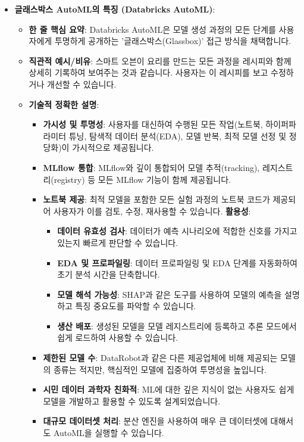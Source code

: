 \documentclass[11pt,a4paper]{article}
\theoremstyle{definition}
\begin{document}
\begin{itemize}
    \item \textbf{글래스박스 AutoML의 특징 (Databricks AutoML)}:
    \begin{itemize}
        \item \textbf{한 줄 핵심 요약}: Databricks AutoML은 모델 생성 과정의 모든 단계를 사용자에게 투명하게 공개하는 '글래스박스(Glassbox)' 접근 방식을 채택합니다.
        \item \textbf{직관적 예시/비유}: 스마트 오븐이 요리를 만드는 모든 과정을 레시피와 함께 상세히 기록하여 보여주는 것과 같습니다. 사용자는 이 레시피를 보고 수정하거나 개선할 수 있습니다.
        \item \textbf{기술적 정확한 설명}:
        \begin{itemize}
            \item \textbf{가시성 및 투명성}: 사용자를 대신하여 수행된 모든 작업(노트북, 하이퍼파라미터 튜닝, 탐색적 데이터 분석(EDA), 모델 반복, 최적 모델 선정 및 정당화)이 가시적으로 제공됩니다.
            \item \textbf{MLflow 통합}: MLflow와 깊이 통합되어 모델 추적(tracking), 레지스트리(registry) 등 모든 MLflow 기능이 함께 제공됩니다.
            \item \textbf{노트북 제공}: 최적 모델을 포함한 모든 실험 과정의 노트북 코드가 제공되어 사용자가 이를 검토, 수정, 재사용할 수 있습니다.
            \textbf{활용성}:
            \begin{itemize}
                \item \textbf{데이터 유효성 검사}: 데이터가 예측 시나리오에 적합한 신호를 가지고 있는지 빠르게 판단할 수 있습니다.
                \item \textbf{EDA 및 프로파일링}: 데이터 프로파일링 및 EDA 단계를 자동화하여 초기 분석 시간을 단축합니다.
                \item \textbf{모델 해석 가능성}: SHAP과 같은 도구를 사용하여 모델의 예측을 설명하고 특징 중요도를 파악할 수 있습니다.
                \item \textbf{생산 배포}: 생성된 모델을 모델 레지스트리에 등록하고 추론 모드에서 쉽게 로드하여 사용할 수 있습니다.
            \end{itemize}
            \item \textbf{제한된 모델 수}: DataRobot과 같은 다른 제공업체에 비해 제공되는 모델의 종류는 적지만, 핵심적인 모델에 집중하여 투명성을 높입니다.
            \item \textbf{시민 데이터 과학자 친화적}: ML에 대한 깊은 지식이 없는 사용자도 쉽게 모델을 개발하고 활용할 수 있도록 설계되었습니다.
            \item \textbf{대규모 데이터셋 처리}: 분산 엔진을 사용하여 매우 큰 데이터셋에 대해서도 AutoML을 실행할 수 있습니다.
        \end{itemize}
    \end{itemize}


\end{itemize}
\end{document}
